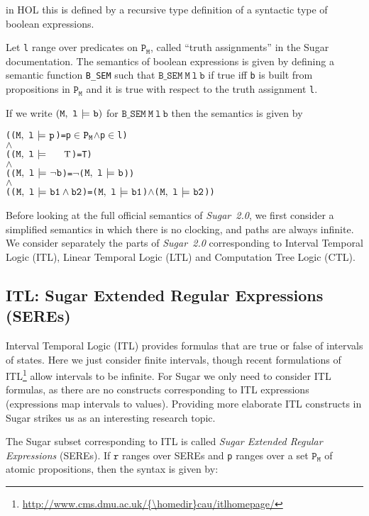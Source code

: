 \documentclass{llncs}
\newcommand{\And}{\(\wedge\)}
\newcommand{\Not}{\(\neg\)}
\newcommand{\In}{\(\in\)}
\newcommand{\T}{\texttt{\small\rm{T}}}
\newcommand{\bTrue}{\T}
\newcommand{\BSem}[3]{(\(\tt#1,~#2~{\models}~#3\))}
\newcommand{\Bsem}{\texttt{B\_SEM}\xspace}
\newcommand{\bSem}[3]{(\tt#1,~#2~{\models}~#3)}
\newcommand{\bProp}[1]{#1}
\newcommand{\bNot}[1]{\neg#1}
\newcommand{\bAnd}[2]{#1\wedge#2}
\newcommand\Sugar{{\it{Sugar~2.0}}\xspace}
\newcommand\Hol{HOL\xspace}
\renewcommand{\t}[1]{\texttt{#1}}
\begin{document}
\medskip

\noindent in \Hol this is defined by a recursive type definition of
a syntactic type of boolean expressions.

Let \t{l} range over predicates on $\t{P}_{\t{M}}$, called ``truth assignments'' in the Sugar
documentation.
The semantics of boolean expressions
is given by defining a semantic function \Bsem such that
$\Bsem~\t{M}~\t{l}~\t{b}$ if true iff \t{b} is built from propositions in $\t{P}_{\t{M}}$ and
it is true with respect to the truth assignment \t{l}.

If we write $\bSem{M}{l}{b}$ for $\Bsem~\t{M}~\t{l}~\t{b}$
then the semantics is given by


{\begin{alltt}
   ({\BSem{M}{l}{\bProp{p}}}     = p {\In} \(\t{P}\sb{\t{M}}\) {\And} p {\In} l)
   {\And}
   ({\BSem{M}{l}{\bTrue}}     = T)
   {\And}
   ({\BSem{M}{l}{{\bNot{b}}}}    = {\Not}{\BSem{M}{l}{b}})
   {\And}
   ({\BSem{M}{l}{\bAnd{b1}{b2}}} = {\BSem{M}{l}{b1}} {\And} {\BSem{M}{l}{b2}})
\end{alltt}}

\medskip



Before looking at the full official semantics of \Sugar, we first
consider a simplified semantics in which there is no clocking, and paths
are always infinite. We consider separately the parts of \Sugar corresponding
to Interval Temporal Logic (ITL), Linear Temporal Logic (LTL) and
Computation Tree Logic (CTL).


\subsection{ITL: Sugar Extended Regular Expressions (SEREs)}\label{SimpleSERE}

Interval Temporal Logic (ITL) provides formulas that are true or false
of intervals of states.  Here we just consider finite intervals,
though recent formulations of ITL\footnote{\url{http://www.cms.dmu.ac.uk/{\homedir}cau/itlhomepage/}} 
allow intervals to be infinite. For
Sugar we only need to consider ITL formulas, as there are no constructs
corresponding to ITL expressions (expressions map intervals to
values). Providing more elaborate ITL constructs in Sugar strikes us as an interesting research topic.



The Sugar subset corresponding to ITL is called {\it Sugar Extended
Regular Expressions} (SEREs).  If $\t{r}$ ranges over SEREs and \t{p} ranges over a
set  $\t{P}_{\t{M}}$ of atomic propositions, then the syntax is given by:
\end{document}
